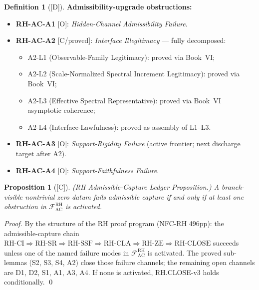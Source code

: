 \documentclass[12pt,oneside]{amsbook}
\theoremstyle{plain}
\newtheorem{proposition}[theorem]{Proposition}
\theoremstyle{definition}
\newtheorem{definition}[theorem]{Definition}
\theoremstyle{remark}
\newcommand{\status}[1]{\textup{[#1]}}
\begin{document}
\begin{definition}[\status{D}]
\medskip
\noindent\textbf{Admissibility-upgrade obstructions:}
\begin{itemize}
 \item \textbf{RH-AC-A1} [O]: \emph{Hidden-Channel Admissibility
 Failure}.
 \item \textbf{RH-AC-A2} [C/proved]: \emph{Interface Illegitimacy}
 --- fully decomposed:
 \begin{itemize}
 \item A2-L1 (Observable-Family Legitimacy): proved via Book~VI;
 \item A2-L2 (Scale-Normalized Spectral Increment Legitimacy):
 proved via Book~VI;
 \item A2-L3 (Effective Spectral Representative): proved via
 Book~VI asymptotic coherence;
 \item A2-L4 (Interface-Lawfulness): proved as assembly of L1--L3.
 \end{itemize}
 \item \textbf{RH-AC-A3} [O]: \emph{Support-Rigidity Failure}
 (active frontier; next discharge target after A2).
 \item \textbf{RH-AC-A4} [O]: \emph{Support-Faithfulness Failure}.
\end{itemize}
\end{definition}

\begin{proposition}[\status{C}]\label{prop:rh-ac-ledger}
\textup{(RH Admissible-Capture Ledger Proposition.)}
A branch-visible nontrivial zero datum fails admissible capture if
and only if at least one obstruction in
$\mathcal{F}^{\mathrm{RH}}_{\mathrm{AC}}$ is activated.
\end{proposition}

\begin{proof}
By the structure of the RH proof program (NFC-RH 496pp):
the admissible-capture chain
$\mathrm{RH\text{-}CI} \Rightarrow \mathrm{RH\text{-}SR}
\Rightarrow \mathrm{RH\text{-}SSF} \Rightarrow
\mathrm{RH\text{-}CLA} \Rightarrow \mathrm{RH\text{-}ZE}
\Rightarrow \mathrm{RH\text{-}CLOSE}$
succeeds unless one of the named failure modes in
$\mathcal{F}^{\mathrm{RH}}_{\mathrm{AC}}$ is activated.
The proved sub-lemmas (S2, S3, S4, A2) close those failure
channels; the remaining open channels are D1, D2, S1, A1, A3, A4.
If none is activated, RH.CLOSE-v3 holds conditionally. \qed
\end{proof}
\end{document}
